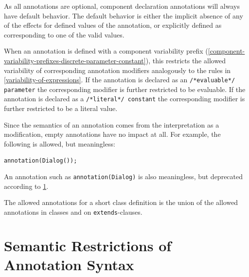 As all annotations are optional, component declaration annotations will always have default behavior.
The default behavior is either the implicit absence of any of the effects for defined values of the annotation, or explicitly defined as corresponding to one of the valid values.

When an annotation is defined with a component variability prefix (\cref{component-variability-prefixes-discrete-parameter-constant}), this restricts the allowed variability of corresponding annotation modifiers analogously to the rules in \cref{variability-of-expressions}.
If the annotation is declared as an \lstinline!/*evaluable*/ parameter! the corresponding modifier is further restricted to be evaluable.
If the annotation is declared as a \lstinline!/*literal*/ constant! the corresponding modifier is further restricted to be a literal value.

\begin{example}
Since the semantics of an annotation comes from the interpretation as a modification, empty annotations have no impact at all.
For example, the following is allowed, but meaningless:
\begin{lstlisting}[language=modelica]
annotation(Dialog());
\end{lstlisting}
An annotation such as \lstinline!annotation(Dialog)! is also meaningless, but deprecated according to \cref{semantic-restrictions-of-annotation-syntax}.
\end{example}

The allowed annotations for a short class definition is the union of the allowed annotations in classes and on \lstinline!extends!-clauses.


\section{Semantic Restrictions of Annotation Syntax}\label{semantic-restrictions-of-annotation-syntax}

